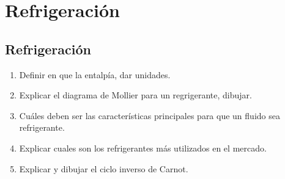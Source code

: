 \documentclass[../main]{subfiles}
\begin{document}
\chapter{Refrigeración}


\section{Refrigeración}

\begin{enumerate}
    \item Definir en que la entalpía, dar unidades.
    \item Explicar el diagrama de Mollier para un regrigerante, dibujar.
    \item Cuáles deben ser las características principales para que un fluido sea refrigerante.
    \item Explicar cuales son los refrigerantes más utilizados en el mercado.
    \item Explicar y dibujar el ciclo inverso de Carnot.
\end{enumerate}
\end{document}
